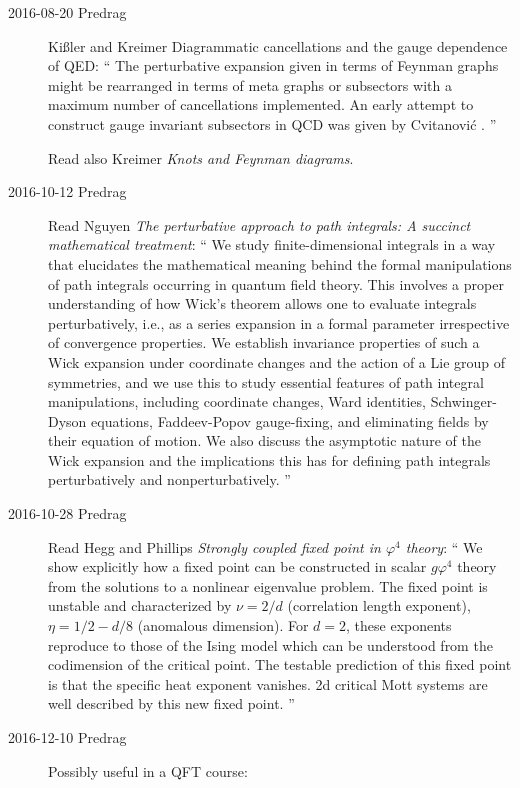 \begin{description}
\item[2016-08-20 Predrag]
Ki{\ss}ler and Kreimer
{Diagrammatic cancellations and the gauge dependence of {QED}}:
``
The perturbative expansion given in terms of Feynman graphs might be
rearranged in terms of meta graphs or subsectors with a maximum number of
cancellations implemented. An early attempt to construct gauge invariant
subsectors in QCD was given by Cvitanovi\'c \etal{}.
''

Read also Kreimer
{\em Knots and {Feynman} diagrams}.

\item[2016-10-12 Predrag]
Read Nguyen
{\em The perturbative approach to path integrals:
{A} succinct mathematical treatment}: ``
We study finite-dimensional integrals in a way that elucidates the
mathematical meaning behind the formal manipulations of path integrals
occurring in quantum field theory. This involves a proper understanding
of how Wick's theorem allows one to evaluate integrals perturbatively,
i.e., as a series expansion in a formal parameter irrespective of
convergence properties. We establish invariance properties of such a Wick
expansion under coordinate changes and the action of a Lie group of
symmetries, and we use this to study essential features of path integral
manipulations, including coordinate changes, Ward identities,
Schwinger-Dyson equations, Faddeev-Popov gauge-fixing, and eliminating
fields by their equation of motion. We also discuss the asymptotic nature
of the Wick expansion and the implications this has for defining path
integrals perturbatively and nonperturbatively.
''

\item[2016-10-28 Predrag]
Read Hegg and Phillips
{\em Strongly coupled fixed point in {$\varphi^4$} theory}: `` We show
explicitly how a fixed point can be constructed in scalar {$g\varphi^4$}
theory from the solutions to a nonlinear eigenvalue problem. The fixed
point is unstable and characterized by {$\nu=2/d$} (correlation length
exponent), {$\eta=1/2-d/8$} (anomalous dimension). For $d=2$, these
exponents reproduce to those of the Ising model which can be understood
from the codimension of the critical point. The testable prediction of
this fixed point is that the specific heat exponent vanishes. 2d critical
Mott systems are well described by this new fixed point. ''

\item[2016-12-10 Predrag] Possibly useful in a QFT course:


\end{description}
